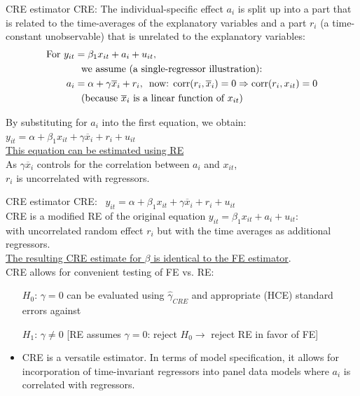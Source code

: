 \documentclass[usenames,dvipsnames]{beamer}
\begin{document}
\begin{frame}{CRE estimator}
CRE: The individual-specific effect $a_i$ is split up into a part that is related to the time-averages of the explanatory variables and a part $r_i$ (a time-constant unobservable) that is unrelated to the explanatory variables: 
\begin{align*}
\textnormal{For } y_{it} & =  \beta_1 x_{it} + a_i + u_{it}, \\
&\textnormal{~~we assume (a single-regressor illustration):}\\ 
a_i & = \alpha + \gamma \overline{x}_i + r_i \textnormal{,~~now: } \textnormal{corr}(r_i, \overline{x}_i) = 0 \Rightarrow \textnormal{corr}(r_i,x_{it}) = 0\\ 
&\textnormal{~~(because $\overline{x}_i$  is a linear function of  $x_{it}$)}
\end{align*}

By substituting for $a_i$ into the first equation, we obtain: \\
$y_{it} = \alpha + \beta_1 x_{it} + \gamma \overline{x}_i + r_i + u_{it}$ \\
\bigskip
\underline{This equation can be estimated using RE}\\
As $\gamma \overline{x}_i$ controls for the correlation between $a_i$ and $x_{it}$, \\$r_i$ is uncorrelated with regressors.
\end{frame}
\begin{frame}{CRE estimator}
CRE: \ $y_{it} = \alpha + \beta_1 x_{it} + \gamma \overline{x}_i + r_i + u_{it}$ \\
\medskip
\small CRE is a modified RE of the original equation $y_{it} =  \beta_1 x_{it} + a_i + u_{it}$: \\
\vspace{0.2cm}
with uncorrelated random effect $r_i$ but with the time averages as additional regressors. \\
\vspace{0.3cm}
\underline{The resulting CRE estimate for $\beta$ is identical to the FE estimator}. \\ \medskip
CRE allows for convenient testing of FE vs. RE:
	\begin{itemize}
	\item[$H_0$:] $\gamma = 0$ can be evaluated using $\hat{\gamma}_{\textit{CRE}}$ and appropriate (HCE) standard errors against
	\item[$H_1$:] $\gamma \neq 0$ [RE assumes $\gamma = 0$: reject $H_0\rightarrow$ reject RE in favor of FE]
	\end{itemize}

\begin{itemize}
    \item CRE is a versatile estimator. In terms of model specification, it allows for incorporation of time-invariant regressors into panel data models where $a_i$ is correlated with regressors.
\end{itemize}
\end{frame}
\end{document}

